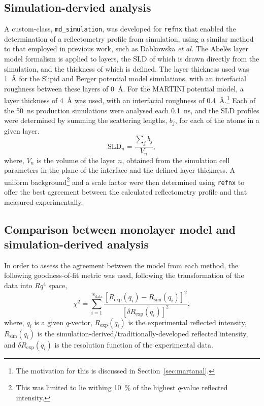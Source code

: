 \subsection{Simulation-dervied analysis}
A custom-class, \texttt{md\_simulation}, was developed for \texttt{refnx}\autocite{nelson_refnx_2019,nelson_refnx_2019-1} that enabled the determination of a reflectometry profile from simulation, using a similar method to that employed in previous work, such as Dabkowska \emph{et al.}\autocite{dabkowska_modulation_2014}
The Abel\`{e}s layer model formalism is applied to layers, the SLD of which is drawn directly from the simulation, and the thickness of which is defined.
The layer thickness used was \SI{1}{\angstrom} for the Slipid and Berger potential model simulations, with an interfacial roughness between these layers of \SI{0}{\angstrom}.
For the MARTINI potential model, a layer thickness of \SI{4}{\angstrom} was used, with an interfacial roughness of \SI{0.4}{\angstrom}.\footnote{The motivation for this is discussed in Section~\ref{sec:martanal}.}
Each of the \SI{50}{\nano\second} production simulations were analysed each \SI{0.1}{\nano\second}, and the SLD profiles were determined by summing the scattering lengths, $b_j$, for each of the atoms in a given layer.
%
\begin{equation}
\text{SLD}_n = \frac{\sum_j b_j}{V_n},
\end{equation}
%
where, $V_n$ is the volume of the layer $n$, obtained from the simulation cell parameters in the plane of the interface and the defined layer thickness.
A uniform background\footnote{This was limited to lie withing \SI{10}{\percent} of the highest $q$-value reflected intensity.} and a scale factor were then determined using \texttt{refnx} to offer the best agreement between the calculated reflectometry profile and that measured experimentally.

\subsection{Comparison between monolayer model and simulation-derived analysis}
In order to assess the agreement between the model from each method, the following goodness-of-fit metric was used, following the transformation of the data into $Rq^4$ space,
%
\begin{equation}
\chi^2 = \sum_{i=1}^{N_{\text{data}}}{\frac{[R_{\text{exp}}(q_i) - R_{\text{sim}}(q_i)]^2}{[\delta R_{\text{exp}}(q_i)]^2}},
\end{equation}
%
where, $q_i$ is a given $q$-vector, $R_{\text{exp}}(q_i)$ is the experimental reflected intensity, $R_{\text{sim}}(q_i)$ is the simulation-derived/traditionally-developed reflected intensity, and $\delta R_{\text{exp}}(q_i)$ is the resolution function of the experimental data.

